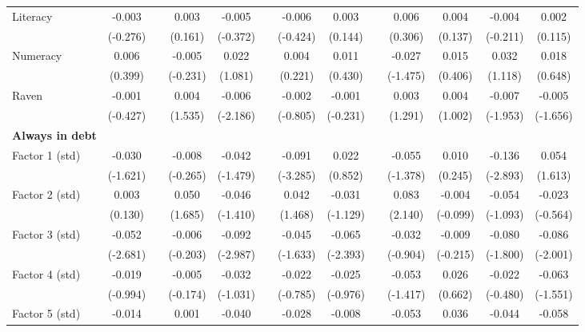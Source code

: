 \begin{table}[htbp]
{\begin{tabular}{lcccccccccccc}
    Literacy & -0.003 &   & 0.003 & -0.005 &   & -0.006 & 0.003 &   & 0.006 & 0.004 & -0.004 & 0.002 \\
      & (-0.276) &   & (0.161) & (-0.372) &   & (-0.424) & (0.144) &   & (0.306) & (0.137) & (-0.211) & (0.115) \\
    Numeracy & 0.006 &   & -0.005 & 0.022 &   & 0.004 & 0.011 &   & -0.027 & 0.015 & 0.032 & 0.018 \\
      & (0.399) &   & (-0.231) & (1.081) &   & (0.221) & (0.430) &   & (-1.475) & (0.406) & (1.118) & (0.648) \\
    Raven & -0.001 &   & 0.004 & \cellcolor[rgb]{ 1,  1,  0}-0.006 &   & -0.002 & -0.001 &   & 0.003 & 0.004 & \cellcolor[rgb]{ 1,  1,  0}-0.007 & \cellcolor[rgb]{ 1,  1,  0}-0.005 \\
      & (-0.427) &   & (1.535) & (-2.186) &   & (-0.805) & (-0.231) &   & (1.291) & (1.002) & (-1.953) & (-1.656) \\
    \midrule
    \textbf{Always in debt} &   &   &   &   &   &   &   &   &   &   &   &  \\
    Factor 1 (std) & -0.030 &   & -0.008 & -0.042 &   & \cellcolor[rgb]{ 1,  1,  0}-0.091 & 0.022 &   & -0.055 & 0.010 & \cellcolor[rgb]{ 1,  1,  0}-0.136 & 0.054 \\
      & (-1.621) &   & (-0.265) & (-1.479) &   & (-3.285) & (0.852) &   & (-1.378) & (0.245) & (-2.893) & (1.613) \\
    Factor 2 (std) & 0.003 &   & \cellcolor[rgb]{ 1,  1,  0}0.050 & -0.046 &   & 0.042 & -0.031 &   & \cellcolor[rgb]{ 1,  1,  0}0.083 & -0.004 & -0.054 & -0.023 \\
      & (0.130) &   & (1.685) & (-1.410) &   & (1.468) & (-1.129) &   & (2.140) & (-0.099) & (-1.093) & (-0.564) \\
    Factor 3 (std) & \cellcolor[rgb]{ 1,  1,  0}-0.052 &   & -0.006 & \cellcolor[rgb]{ 1,  1,  0}-0.092 &   & -0.045 & \cellcolor[rgb]{ 1,  1,  0}-0.065 &   & -0.032 & -0.009 & \cellcolor[rgb]{ 1,  1,  0}-0.080 & \cellcolor[rgb]{ 1,  1,  0}-0.086 \\
      & (-2.681) &   & (-0.203) & (-2.987) &   & (-1.633) & (-2.393) &   & (-0.904) & (-0.215) & (-1.800) & (-2.001) \\
    Factor 4 (std) & -0.019 &   & -0.005 & -0.032 &   & -0.022 & -0.025 &   & -0.053 & 0.026 & -0.022 & -0.063 \\
      & (-0.994) &   & (-0.174) & (-1.031) &   & (-0.785) & (-0.976) &   & (-1.417) & (0.662) & (-0.480) & (-1.551) \\
    Factor 5 (std) & -0.014 &   & 0.001 & -0.040 &   & -0.028 & -0.008 &   & -0.053 & 0.036 & -0.044 & -0.058 \\

\end{tabular}}
\end{table}
